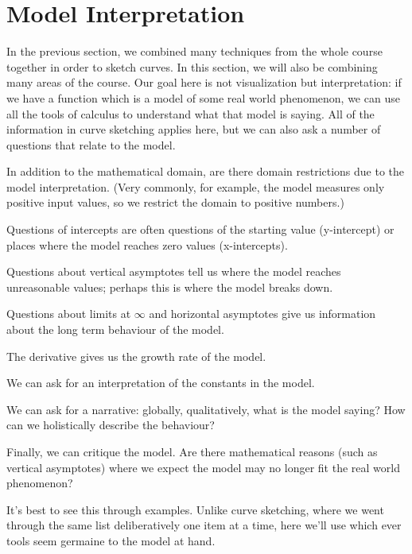 \documentclass[fleqn]{report}
\begin{document}
\section{Model Interpretation}
\label{model-interpretation}

In the previous section, we combined many techniques from the
whole course together in order to sketch curves. In this
section, we will also be combining many areas of the course.
Our goal here is not visualization but interpretation: if we
have a function which is a model of some real world
phenomenon, we can use all the tools of calculus to understand
what that model is saying. All of the information in curve
sketching applies here, but we can also ask a number of
questions that relate to the model.

\begin{smallitemize}
\item In addition to the mathematical domain, are there domain
restrictions due to the model interpretation. (Very commonly,
for example, the model measures only positive input values, so
we restrict the domain to positive numbers.)
\item Questions of intercepts are often questions of the
starting value (y-intercept) or places where the model reaches
zero values (x-intercepts).
\item Questions about vertical asymptotes tell us where the
model reaches unreasonable values; perhaps this is where the
model breaks down.
\item Questions about limits at $\infty$ and horizontal
asymptotes give us information about the long term behaviour
of the model.
\item The derivative gives us the growth rate of the model.
\item We can ask for an interpretation of the constants in the
model.
\item We can ask for a narrative: globally, qualitatively,
what is the model saying? How can we holistically describe
the behaviour?
\item Finally, we can critique the model. Are there
mathematical reasons (such as vertical asymptotes) where we
expect the model may no longer fit the real world phenomenon?
\end{smallitemize}

It's best to see this through examples. Unlike curve
sketching, where we went through the same list deliberatively
one item at a time, here we'll use which ever tools seem
germaine to the model at hand. 
\end{document}
